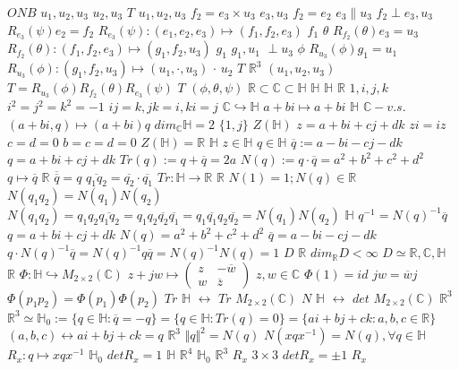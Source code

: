 \documentclass{article}
\begin{document}
$ONB$
$u_1,u_2,u_3$
$u_2,u_3$
$T$
$u_1,u_2,u_3$
$f_2=e_3 \times u_3$
$e_3,u_3$
$f_2=e_2$
$e_3 \parallel u_3$
$f_2 \perp e_3,u_3$
$R_{e_3}(\psi)e_2=f_2$
$R_{e_3}(\psi):(e_1,e_2,e_3) \mapsto (f_1,f_2,e_3)$
$f_1$
$\theta$
$R_{f_2}(\theta)e_3=u_3$
$R_{f_2}(\theta):(f_1,f_2,e_3) \mapsto (g_1,f_2,u_3)$
$g_1$
$g_1,u_1$
$\perp u_3$
$\phi$
$R_{u_3}(\phi)g_1=u_1$
$R_{u_3}(\phi):(g_1,f_2,u_3) \mapsto (u_1, \cdot, u_3)$
$\cdot$
$u_2$
$T$
$\mathbb{R}^3$
$(u_1,u_2,u_3)$
$T=R_{u_3}(\phi)R_{f_2}(\theta)R_{e_3}(\psi)$
$T$
$(\phi,\theta,\psi)$
$\mathbb{R} \subset \mathbb{C} \subset \mathbb{H}$
$\mathbb{H}$
$\mathbb{H}$
$\mathbb{R}$
$1,i,j,k$
$i^2=j^2=k^2=-1$
$ij=k,jk=i,ki=j$
$\mathbb{C} \hookrightarrow \mathbb{H}$
$a+bi \mapsto a+bi$
$\mathbb{H}$
$\mathbb{C}-v.s.$
$(a+bi,q) \mapsto (a+bi)q$
$dim_{\mathbb{C}}\mathbb{H}=2$
$\{1,j\}$
$Z(\mathbb{H})$
$z=a+bi+cj+dk$
$zi=iz$
$c=d=0$
$b=c=d=0$
$Z(\mathbb{H})=\mathbb{R}$
$\mathbb{H}$
$z \in \mathbb{H}$
$q \in \mathbb{H}$
$\overline{q}:=a-bi-cj-dk$
$q=a+bi+cj+dk$
$Tr(q):=q+\overline{q}=2a$
$N(q):=q \cdot \overline{q}=a^2+b^2+c^2+d^2$
$q \mapsto \overline{q}$
$\mathbb{R}$
$\overline{\overline{q}}=q$
$\overline{q_1q_2}=\overline{q_2} \cdot \overline{q_1}$
$Tr:\mathbb{H} \rightarrow \mathbb{R}$
$\mathbb{R}$
$N(1)=1;N(q) \in \mathbb{R}$
$N(q_1q_2)=N(q_1)N(q_2)$
$N(q_1q_2)=q_1q_2\overline{q_1q_2}=q_1q_2\overline{q_2}\overline{q_1}=q_1\overline{q_1}q_2\overline{q_2}=N(q_1)N(q_2)$
$\mathbb{H}$
$q^{-1}=N(q)^{-1}\overline{q}$
$q=a+bi+cj+dk$
$N(q)=a^2+b^2+c^2+d^2$
$\overline{q}=a-bi-cj-dk$
$q \cdot N(q)^{-1}\overline{q}=N(q)^{-1}q\overline{q}=N(q)^{-1}N(q)=1$
$D$
$\mathbb{R}$
$dim_\mathbb{R}D < \infty$
$D \simeq \mathbb{R},\mathbb{C},\mathbb{H}$
$\mathbb{R}$
$\Phi:\mathbb{H} \hookrightarrow M_{2 \times 2} (\mathbb{C})$
$z+jw \mapsto \begin{pmatrix}z&-\overline{w}\\ w&\overline{z}\end{pmatrix}$
$z,w \in \mathbb{C}$
$\Phi(1)=id$
$jw=\overline{w}j$
$\Phi(p_1p_2)=\Phi(p_1)\Phi(p_2)$
$Tr$
$\mathbb{H}$
$\leftrightarrow$
$Tr$
$M_{2 \times 2}(\mathbb{C})$
$N$
$\mathbb{H}$
$\leftrightarrow$
$det$
$M_{2 \times 2}(\mathbb{C})$
$\mathbb{R}^3$
$\mathbb{R}^3 \simeq \mathbb{H}_0:=\{q \in \mathbb{H}:\overline{q}=-q\}=\{q \in \mathbb{H}:Tr(q)=0\}=\{ai+bj+ck:a,b,c \in \mathbb{R}\}$
$(a,b,c) \leftrightarrow ai+bj+ck=q$
$\mathbb{R}^3$
$\Vert q \Vert^2=N(q)$
$N(xqx^{-1})=N(q),\forall q \in \mathbb{H}$
$R_x:q \mapsto xqx^{-1}$
$\mathbb{H}_0$
$detR_x=1$
$\mathbb{H}$
$\mathbb{R}^4$
$\mathbb{H}_0$
$\mathbb{R}^3$
$R_x$
$3 \times 3$
$detR_x=\pm1$
$R_x$
\end{document}

